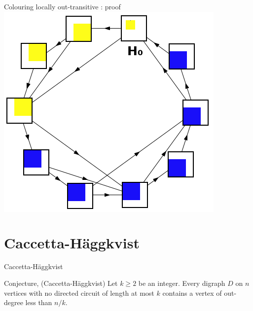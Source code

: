 \documentclass{beamer}
\newcommand{\Hag}{H\"aggkvist\xspace}
\begin{document}
\begin{frame}{Colouring locally out-transitive : proof}
 {
\centering
\includegraphics[scale=0.5]{Images/decomposition_with_colouring.png}
}
\end{frame}

\section{Caccetta-\Hag}

\begin{frame}{Caccetta-\Hag}

\begin{block}{Conjecture, (Caccetta-\Hag)}
Let $k\geq 2$ be an integer. Every digraph $D$ on $n$ vertices with no directed circuit of length at most $k$ contains a vertex of out-degree less than $n/k$.
\end{block}

\end{frame}
\end{document}
